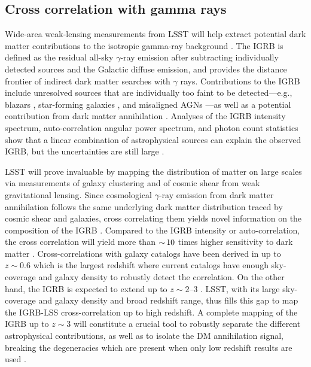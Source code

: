 \subsection{Cross correlation with gamma rays }
\label{sec:igrb_id}

Wide-area weak-lensing measurements from LSST will help extract  potential dark matter contributions to the isotropic gamma-ray background \citep[IGRB;][]{1410.3696}. The IGRB is defined as the residual all-sky $\gamma$-ray emission after subtracting individually detected sources and the Galactic diffuse emission, and provides the distance frontier of indirect dark matter searches with $\gamma$ rays. Contributions to the IGRB include unresolved sources that are individually too faint to be detected---e.g., blazars \citep{1110.3787,1310.0006}, star-forming galaxies \citep{1206.1346}, and misaligned AGNs \citep{1304.0908}---as well as a potential contribution from dark matter annihilation \citep{1312.0608,1501.05464,1501.05301,1608.07289}. Analyses of the IGRB intensity spectrum, auto-correlation angular power spectrum, and photon count statistics show that a linear combination of astrophysical sources can explain the observed IGRB, but the uncertainties are still large \citep[e.g.,][]{1502.02866}.

LSST will prove invaluable by mapping the distribution of matter on large scales via measurements of galaxy clustering and of cosmic shear from weak gravitational lensing. 
Since  cosmological $\gamma$-ray emission from dark matter annihilation follows the same underlying dark matter distribution traced by cosmic shear and galaxies, cross correlating them yields novel information on the composition of the IGRB \citep{1212.5018,1411.4651,1506.01030,Lisanti:2018,1312.4403}. 
Compared to the IGRB intensity or auto-correlation, the cross correlation will yield more than $ {\sim}\, 10$ times higher sensitivity to dark matter \citep{1411.4651,1503.05922}.
Cross-correlations with galaxy catalogs have been derived in \cite{1709.01940,1503.05918,1103.4861} up to $z \sim 0.6$ 
which is the largest redshift where current catalogs have enough sky-coverage and galaxy density to robustly
detect the correlation.  On the other hand, the IGRB is expected to extend up to $z \sim 2$--$3$ \citep{1502.02866}. 
LSST, with its large sky-coverage and galaxy density and broad redshift range, thus fills this gap to map the IGRB-LSS cross-correlation up to high redshift. 
A complete mapping of the IGRB up to $z \sim 3$ will constitute a crucial tool to robustly separate the different 
astrophysical contributions, as well as to isolate the DM annihilation signal, breaking the degeneracies which
are present when only low redshift results are used \citep{1506.01030}.    

